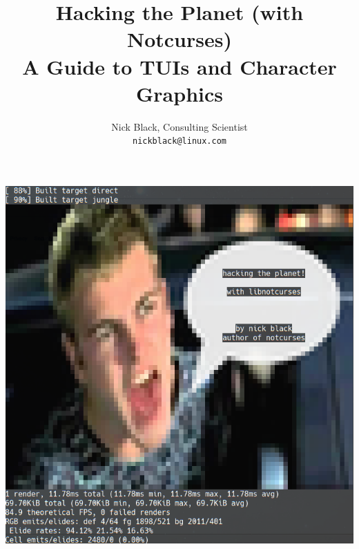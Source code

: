 \documentclass[letterpaper,10pt]{article}
\title{Hacking the Planet (with Notcurses)\\
A Guide to TUIs and Character Graphics
}
\author{Nick Black, Consulting Scientist\\
\texttt{nickblack@linux.com}
}
\begin{document}

\maketitle
\date{}
\vspace{1in}
\begin{center}
\includegraphics[width=.75\linewidth]{htp-with-notcurses.png}
\end{center}
\thispagestyle{empty}

\clearpage
{}
\end{document}
